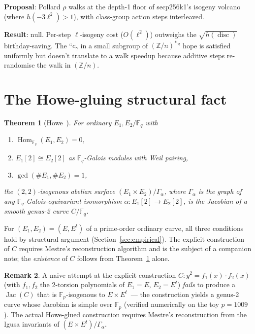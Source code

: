 \documentclass[11pt,a4paper]{article}
\newtheorem{theorem}{Theorem}[section]
\theoremstyle{definition}
\newtheorem{remark}[theorem]{Remark}
\newcommand{\FF}{\mathbb{F}}
\newcommand{\ZZ}{\mathbb{Z}}
\newcommand{\Hom}{\operatorname{Hom}}
\newcommand{\Jac}{\operatorname{Jac}}
\newcommand{\disc}{\operatorname{disc}}
\newcommand{\gcd}{\operatorname{gcd}}
\begin{document}
\textbf{Proposal}: Pollard $\rho$ walks at the depth-1 floor of
secp256k1's isogeny volcano (where $h(-3\ell^2) > 1$), with
class-group action steps interleaved.

\textbf{Result}: null. Per-step $\ell$-isogeny cost ($O(\ell^2)$)
outweighs the $\sqrt{h(\disc)}$ birthday-saving. The
``$c_\gamma$ in a small subgroup of $(\ZZ/n)^*$'' hope is satisfied
uniformly but doesn't translate to a walk speedup because additive
steps re-randomise the walk in $(\ZZ/n)$.

\section{The Howe-gluing structural fact}\label{sec:howe}

\begin{theorem}[Howe~\cite{howe1996}]\label{thm:howe}
For ordinary $E_1, E_2/\FF_q$ with
\begin{enumerate}[label=\textbf{(H\arabic*)}]
\item $\Hom_{\FF_q}(E_1, E_2) = 0$,
\item $E_1[2] \cong E_2[2]$ as $\FF_q$-Galois modules with Weil
      pairing,
\item $\gcd(\#E_1, \#E_2) = 1$,
\end{enumerate}
the $(2,2)$-isogenous abelian surface $(E_1 \times E_2)/\Gamma_\alpha$,
where $\Gamma_\alpha$ is the graph of any
$\FF_q$-Galois-equivariant isomorphism
$\alpha\colon E_1[2] \to E_2[2]$, is the Jacobian of a smooth
genus-2 curve $C/\FF_q$.
\end{theorem}

For $(E_1, E_2) = (E, E^t)$ of a prime-order ordinary curve, all
three conditions hold by structural argument
(Section~\ref{sec:empirical}). The explicit construction of $C$
requires Mestre's reconstruction algorithm and is the subject of a
companion note; the \emph{existence} of $C$ follows from
Theorem~\ref{thm:howe} alone.

\begin{remark}
A naive attempt at the explicit construction
$C\colon y^2 = f_1(x) \cdot f_2(x)$ (with $f_1, f_2$ the 2-torsion
polynomials of $E_1 = E$, $E_2 = E^t$) \emph{fails} to produce a
$\Jac(C)$ that is $\FF_p$-isogenous to $E \times E^t$~--- the
construction yields a genus-2 curve whose Jacobian is simple over
$\FF_p$ (verified numerically on the toy $p = 1009$). The actual
Howe-glued construction requires Mestre's reconstruction from the
Igusa invariants of $(E \times E^t)/\Gamma_\alpha$.
\end{remark}
\end{document}
